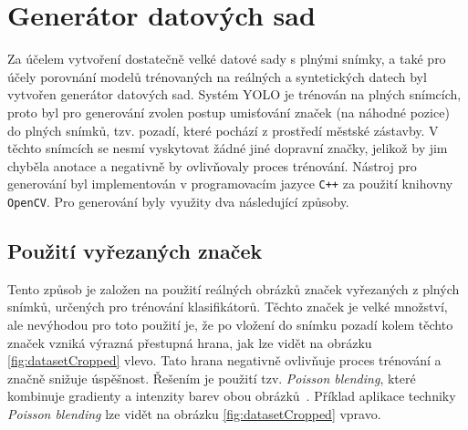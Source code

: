 \documentclass[czech]{ExcelAtFIT} %
\begin{document}
\section{Generátor datových sad}
Za účelem vytvoření dostatečně velké datové sady s plnými snímky, a také pro účely porovnání modelů trénovaných na reálných a syntetických datech byl vytvořen generátor datových sad. Systém YOLO je trénován na plných snímcích, proto byl pro generování zvolen postup umisťování značek (na náhodné pozice) do plných snímků, tzv. pozadí, které pochází z prostředí městské zástavby. V těchto snímcích se nesmí vyskytovat žádné jiné dopravní značky, jelikož by jim chyběla anotace a negativně by ovlivňovaly proces trénování. Nástroj pro generování byl implementován v programovacím jazyce \texttt{C++} za použití knihovny \texttt{OpenCV}. Pro generování byly využity dva následující způsoby.

\subsection{Použití vyřezaných značek}

Tento způsob je založen na použití reálných obrázků značek vyřezaných z plných snímků, určených pro trénování klasifikátorů. Těchto značek je velké množství, ale nevýhodou pro toto použití je, že po vložení do snímku pozadí kolem těchto značek vzniká výrazná přestupná hrana, jak lze vidět na obrázku \ref{fig:datasetCropped} vlevo. Tato hrana negativně ovlivňuje proces trénování a značně snižuje úspěšnost. Řešením je použití tzv. \emph{Poisson blending}, které kombinuje gradienty a intenzity barev obou obrázků~\cite{poisonEditing}. Příklad aplikace techniky \emph{Poisson blending} lze vidět na obrázku \ref{fig:datasetCropped} vpravo.
\end{document}
